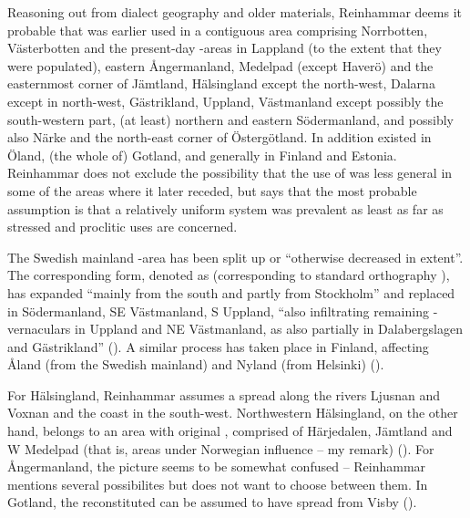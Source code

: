 
Reasoning out from dialect geography and older materials, Reinhammar deems it probable that  was earlier used in a contiguous area comprising Norrbotten, Västerbotten and the present-day -areas in Lappland (to the extent that they were populated), eastern Ångermanland, Medelpad (except Haverö) and the easternmost corner of Jämtland, Hälsingland except the north-west, Dalarna except in north-west, Gästrikland, Uppland, Västmanland except possibly the south-western part, (at least) northern and eastern Södermanland, and possibly also Närke and the north-east corner of Östergötland. In addition  existed in Öland, (the whole of) Gotland, and generally in Finland and Estonia. Reinhammar does not exclude the possibility that the use of  was less general in some of the areas where it later receded, but says that the most probable assumption is that a relatively uniform system was prevalent as least as far as stressed and proclitic uses are concerned.


The Swedish mainland -area has been split up or “otherwise decreased in extent”. The corresponding form, denoted as  (corresponding to standard orthography ), has expanded “mainly from the south and partly from Stockholm” and replaced  in Södermanland, SE Västmanland, S Uppland, “also infiltrating remaining -vernaculars in Uppland and NE Västmanland, as also partially in Dalabergslagen and Gästrikland” (\citet[186]{Reinhammar1975}). A similar process has taken place in Finland, affecting Åland (from the Swedish mainland) and Nyland (from Helsinki) (\citet[187]{Reinhammar1975}).


For Hälsingland, Reinhammar assumes a spread along the rivers Ljusnan and Voxnan and the coast in the south-west. Northwestern Hälsingland, on the other hand, belongs to an area with original , comprised of Härjedalen, Jämtland and W Medelpad (that is, areas under Norwegian influence – my remark) (\citet[186]{Reinhammar1975}). For Ångermanland, the picture seems to be somewhat confused – Reinhammar mentions several possibilites but does not want to choose between them. In Gotland, the reconstituted  can be assumed to have spread from Visby (\citet[188]{Reinhammar1975}). 


